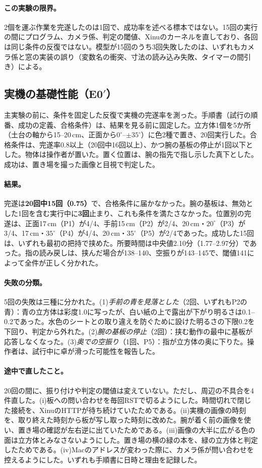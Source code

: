 \documentclass[10pt,letterpaper]{article}
\begin{document}
\paragraph{この実験の限界。}2個を運ぶ作業を完遂したのは1回で、成功率を述べる標本ではない。15回の実行の間にプログラム、カメラ係、判定の閾値、Xinuのカーネルを直しており、各回は同じ条件の反復ではない。模型が15回のうち3回失敗したのは、いずれもカメラ係と窓の実装の誤り（変数名の衝突、寸法の読み込み失敗、タイマーの間引き）による。

\subsection{実機の基礎性能（E0$'$）}\label{sec:e0}
主実験の前に、条件を固定した反復で実機の完遂率を測った。手順書（試行の順番、成功の定義、合格条件）は、結果を見る前に固定した。立方体1個を5か所（土台の軸から15--20\,cm、正面から$0^{\circ}$--$\pm35^{\circ}$）に色2種で置き、20回実行した。合格条件は、完遂率0.8以上（20回中16回以上）、かつ腕の基板の停止が1回以下とした。物体は操作者が置いた。置く位置は、腕の指先で指し示した真下とした。成功は、置き場を撮った画像と目視で判定した。

\paragraph{結果。}完遂は\textbf{20回中15回（0.75）}で、合格条件に届かなかった。腕の基板は、無効とした1回を含む実行中に\textbf{3回}止まり、これも条件を満たさなかった。位置別の完遂は、正面17\,cm（P1）が4/4、手前15\,cm（P2）が2/4、20\,cm・$20^{\circ}$（P3）が3/4、17\,cm・$35^{\circ}$（P4）が4/4、20\,cm・$35^{\circ}$（P5）が2/4であった。成功した15回は、いずれも最初の把持で挟めた。所要時間は中央値2.10分（1.77--2.97分）であった。指の読み戻しは、挟んだ場合が138--140、空振りが143--145で、閾値141によって全件が正しく分かれた。

\paragraph{失敗の分類。}5回の失敗は三種に分かれた。(1)\emph{手前の青を見落とした}（2回、いずれもP2の青）：青の立方体は彩度1.0に写ったが、白い紙の上で露出が下がり明るさは0.1--0.2であった。水色のシートとの取り違えを防ぐために設けた明るさの下限0.2を下回り、判定から外れた。(2)\emph{腕の基板の停止}（2回）：挟む動作の最中に基板が応答しなくなった。(3)\emph{奥での空振り}（1回、P5）：指が立方体の奥に下りた。操作者は、試行中に卓が滑った可能性を報告した。

\paragraph{途中で直したこと。}20回の間に、振り付けや判定の閾値は変えていない。ただし、周辺の不具合を4件直した。(i)板への問い合わせを毎回RSTで切るようにした。時間切れで閉じた接続を、XinuのHTTPが待ち続けていたためである。(ii)実機の画像の時刻を、取り終えた時刻から板が写し取った時刻に改めた。腕が着く前の画像を使い、置き場の確認が左右逆に出ていたためである。(iii)画像の大半に広がる色の面は立方体とみなさないようにした。置き場の横の緑の本を、緑の立方体と判定したためである。(iv)Macのアドレスが変わった際に、カメラ係が問い合わせを控えるようにした。いずれも手順書に日時と理由を記録した。
\end{document}
